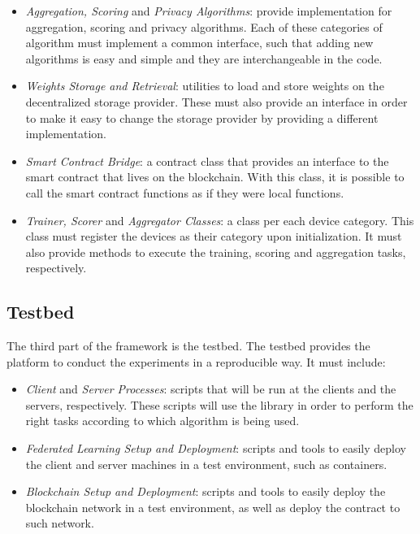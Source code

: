 \begin{itemize}
    \item \textit{Aggregation, Scoring} and \textit{Privacy Algorithms}: provide implementation for aggregation, scoring and privacy algorithms. Each of these categories of algorithm must implement a common interface, such that adding new algorithms is easy and simple and they are interchangeable in the code.
    
    \item \textit{Weights Storage and Retrieval}: utilities to load and store weights on the decentralized storage provider. These must also provide an interface in order to make it easy to change the storage provider by providing a different implementation.
    
    \item \textit{Smart Contract Bridge}: a contract class that provides an interface to the smart contract that lives on the blockchain. With this class, it is possible to call the smart contract functions as if they were local functions.
    
    \item \textit{Trainer, Scorer} and \textit{Aggregator Classes}: a class per each device category. This class must register the devices as their category upon initialization. It must also provide methods to execute the training, scoring and aggregation tasks, respectively.
\end{itemize}

\subsection{Testbed}\label{meth:testbed}

The third part of the framework is the testbed. The testbed provides the platform to conduct the experiments in a reproducible way. It must include:

\begin{itemize}
    \item \textit{Client} and \textit{Server Processes}: scripts that will be run at the clients and the servers, respectively. These scripts will use the library in order to perform the right tasks according to which algorithm is being used.
    
    \item \textit{Federated Learning Setup and Deployment}: scripts and tools to easily deploy the client and server machines in a test environment, such as containers.
    
    \item \textit{Blockchain Setup and Deployment}: scripts and tools to easily deploy the blockchain network in a test environment, as well as deploy the contract to such network.
\end{itemize}


